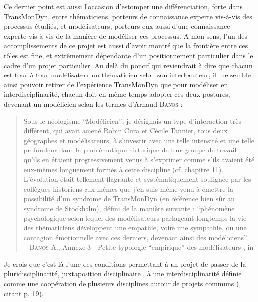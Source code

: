 Ce dernier point est aussi l'occasion d'estomper une différenciation, forte dans TransMonDyn, entre \og thématiciens\fg{}, porteurs de connaissance experte vis-à-vis des processus étudiés, et \og modélisateurs\fg{}, porteurs eux aussi d'une connaissance experte vis-à-vis de la manière de modéliser ces processus.
A mon sens, l'un des accomplissements de ce projet est aussi d'avoir montré que la frontière entre ces \og rôles\fg{} est fine, et extrêmement dépendante d'un positionnement particulier dans le cadre d'un projet particulier.
Au delà du poncif qui reviendrait à dire que chacun est tour à tour modélisateur ou thématicien selon son interlocuteur, il me semble ainsi pouvoir retirer de l'expérience TransMonDyn que pour modéliser en interdisciplinarité, chacun doit en même temps adopter ces deux postures, devenant un \og modélicien\fg{} selon les termes d'Arnaud \textsc{Banos} :
\begin{quotation}
	\noindent \og Sous le néologisme “Modélicien”, je désignais un type d’interaction très différent, qui avait amené Robin Cura et Cécile Tannier, tous deux géographes et modélisateurs, à s’investir avec une telle intensité et une telle profondeur dans la problématique historique de leur groupe de travail qu’ils en étaient progressivement venus à s’exprimer comme s’ils avaient été eux-mêmes longuement formés à cette discipline (cf. chapitre 11).
	L’évolution était tellement flagrante et systématiquement soulignée par les collègues historiens eux-mêmes que j’en suis même venu à émettre la possibilité d’un syndrome de TransMonDyn (en référence bien sûr au syndrome de Stockholm), défini de la manière suivante :
	“phénomène psychologique selon lequel des modélisateurs partageant longtemps la vie des thématiciens développent une empathie, voire une sympathie, ou une contagion émotionnelle avec ces derniers, devenant ainsi des modéliciens”.
	\fg{} \\
	\mbox{}~ \textsc{Banos} A., \og Annexe 3 - Petite typologie “empirique” des modélisateurs \fg{}, in \textcite[484]{ouriachi_lelaboration_2017}
\end{quotation}
Je crois que c'est là l'une des conditions permettant à un projet de passer de la pluridisciplinarité, \og juxtaposition disciplinaire\fg{} \autocite[14]{gravier_deux_2018}, à une interdisciplinarité définie comme une \og coopération de plusieurs disciplines autour de projets communs\fg{} (\cite[14]{gravier_deux_2018}, citant \textcite{AERES2014} p. 19).

